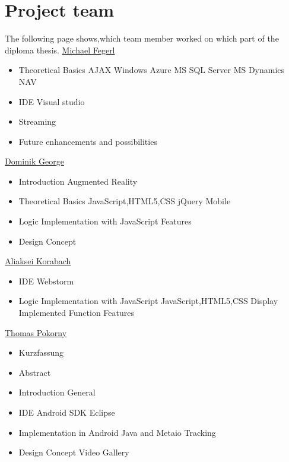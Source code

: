 

\chapter*{Project team}

 The following page shows,which team member worked on which part of the \\diploma
 thesis.
\newline
\newline
 	\uline{Michael Fegerl}
	\begin{itemize}
	\item Theoretical Basics
	\subitem AJAX
	\subitem Windows Azure
	\subitem MS SQL Server
	\subitem MS Dynamics NAV
	\item IDE
	\subitem Visual studio
	\item Streaming
	\item Future enhancements and possibilities
	\end{itemize}
	
	 	\uline{Dominik George}
		\begin{itemize}
		\item Introduction
		\subitem Augmented Reality
		\item Theoretical Basics
		\subitem JavaScript,HTML5,CSS
		\subitem jQuery Mobile
		\item Logic Implementation with JavaScript
		\subitem Features
		\item Design Concept
		\end{itemize}
		
			\uline{Aliaksei Korabach}
				\begin{itemize}
				\item IDE
				\subitem Webstorm
				\item Logic Implementation with JavaScript
				\subitem JavaScript,HTML5,CSS
				\subitem Display
				\subitem Implemented Function
				\subitem Features
			

				\end{itemize}
				
			\uline{Thomas Pokorny}
					\begin{itemize}
					\item Kurzfassung
					\item Abstract
					\item Introduction
				    \subitem General
				    \item IDE
				    \subitem Android SDK Eclipse
				    \item Implementation in Android Java and Metaio Tracking 
				    \item Design Concept
				    \subitem Video Gallery
				
				
					\end{itemize}